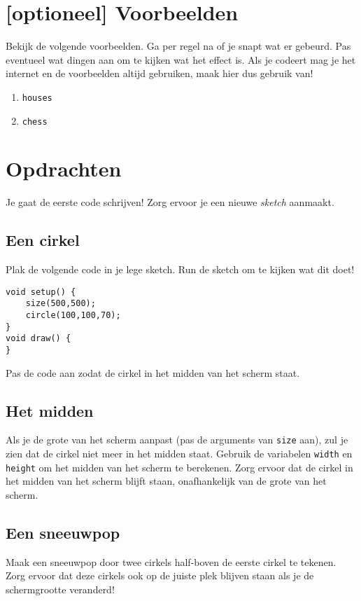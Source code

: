 \documentclass[../syllabus.tex]{subfiles}
\begin{document}
\section{[optioneel] Voorbeelden}
Bekijk de volgende voorbeelden. Ga per regel na of je snapt wat er gebeurd. Pas eventueel wat dingen aan om te kijken wat het effect is. Als je codeert mag je het internet en de voorbeelden altijd gebruiken, maak hier dus gebruik van!
\begin{enumerate}
	\item \texttt{houses}
	\item \texttt{chess}
\end{enumerate}

\newpage
\section{Opdrachten}
Je gaat de eerste code schrijven! Zorg ervoor je een nieuwe \textit{sketch} aanmaakt.
\subsection{Een cirkel}
Plak de volgende code in je lege sketch. Run de sketch om te kijken wat dit doet!
\begin{lstlisting}
void setup() {
    size(500,500);
    circle(100,100,70);
}
void draw() {
}
\end{lstlisting}
Pas de code aan zodat de cirkel in het midden van het scherm staat.
\subsection{Het midden}
Als je de grote van het scherm aanpast (pas de arguments van \texttt{size} aan), zul je zien dat de cirkel niet meer in het midden staat.
Gebruik de variabelen \texttt{width} en \texttt{height} om het midden van het scherm te berekenen. Zorg ervoor dat de cirkel in het midden van het scherm blijft staan, onafhankelijk van de grote van het scherm.
\subsection{Een sneeuwpop}
Maak een sneeuwpop door twee cirkels half-boven de eerste cirkel te tekenen. Zorg ervoor dat deze cirkels ook op de juiste plek blijven staan als je de schermgrootte veranderd!
\end{document}
